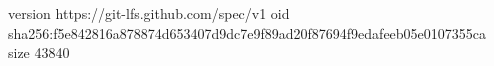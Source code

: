version https://git-lfs.github.com/spec/v1
oid sha256:f5e842816a878874d653407d9dc7e9f89ad20f87694f9edafeeb05e0107355ca
size 43840
